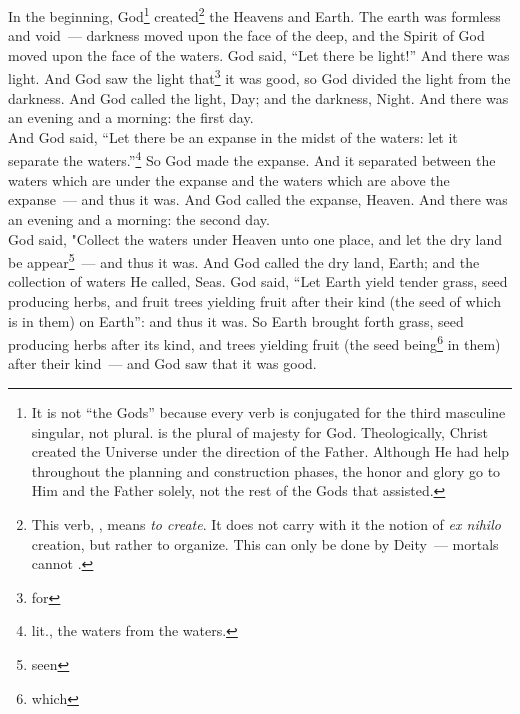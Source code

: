 


\begin{enumerate*}[mode=unboxed]
     In the beginning, God\footnote{It is not ``the Gods'' because every verb is conjugated for the third masculine singular, not plural.  is the plural of majesty for God. Theologically, Christ created the Universe under the direction of the Father. Although He had help throughout the planning and construction phases, the honor and glory go to Him and the Father solely, not the rest of the Gods that assisted.} created\footnote{This verb, , means \textit{to create}. It does not carry with it the notion of \textit{ex nihilo} creation, but rather to organize. This can only be done by Deity~--- mortals cannot .} the Heavens and Earth.%
     The earth was formless and void~--- darkness moved upon the face of the deep, and the Spirit of God moved upon the face of the waters.%
     God said, ``Let there be light!'' And there was light.%
     And God saw the light that\footnote{for} it was good, so God divided the light from the darkness.%
     And God called the light, Day; and the darkness, Night. And there was an evening and a morning: the first day.\\%
     And God said, ``Let there be an expanse in the midst of the waters: let it separate the waters.''\footnote{lit., the waters from the waters.}%
     So God made the expanse. And it separated between the waters which are under the expanse and the waters which are above the expanse~--- and thus it was.%
     And God called the expanse, Heaven. And there was an evening and a morning: the second day.\\%
     God said, "Collect the waters under Heaven unto one place, and let the dry land be appear\footnote{seen}~--- and thus it was.%
     And God called the dry land, Earth; and the collection of waters He called, Seas.%
     God said, ``Let Earth yield tender grass, seed producing herbs, and fruit trees yielding fruit after their kind (the seed of which is in them) on Earth'': and thus it was.%
     So Earth brought forth grass, seed producing herbs after its kind, and trees yielding fruit (the seed being\footnote{which} in them) after their kind~--- and God saw that it was good.%

\end{enumerate*}
